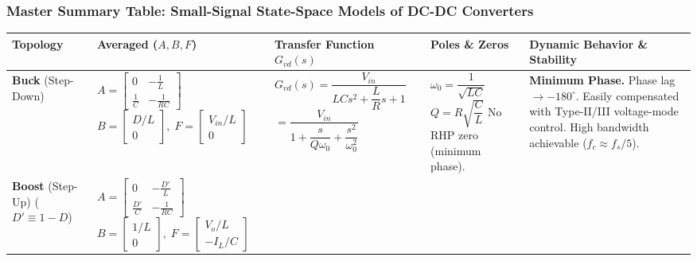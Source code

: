 \subsubsection{Master Summary Table: Small-Signal State-Space Models of DC-DC Converters}
\begin{center}
\footnotesize
\renewcommand{\arraystretch}{1.25}
\begin{tabularx}{\textwidth}{@{} >{\raggedright\arraybackslash}p{2.0cm} >{\raggedright\arraybackslash}p{2.6cm} >{\raggedright\arraybackslash}p{4.8cm} >{\raggedright\arraybackslash}p{2.6cm} >{\raggedright\arraybackslash}X @{}}
\toprule
\textbf{Topology} & \textbf{Averaged ($A, B, F$)} & \textbf{Transfer Function $G_{vd}(s)$} & \textbf{Poles \& Zeros} & \textbf{Dynamic Behavior \& Stability} \\
\midrule
\textbf{Buck} \newline (Step-Down) &
$A = \begin{bmatrix} 0 & -\frac{1}{L} \\ \frac{1}{C} & -\frac{1}{RC} \end{bmatrix}$ \newline
$B = \begin{bmatrix} D/L \\ 0 \end{bmatrix}, \; F = \begin{bmatrix} V_{in}/L \\ 0 \end{bmatrix}$ &
$G_{vd}(s) = \dfrac{V_{in}}{L C s^2 + \dfrac{L}{R} s + 1}$ \newline
$= \dfrac{V_{in}}{1 + \dfrac{s}{Q\omega_0} + \dfrac{s^2}{\omega_0^2}}$ &
$\omega_0 = \dfrac{1}{\sqrt{LC}}$ \newline
$Q = R\sqrt{\dfrac{C}{L}}$ \newline
No RHP zero (minimum phase). &
\textbf{Minimum Phase.} Phase lag $\to -180^\circ$. Easily compensated with Type-II/III voltage-mode control. High bandwidth achievable ($f_c \approx f_s/5$). \\
\midrule
\textbf{Boost} \newline (Step-Up) \newline ($D' \equiv 1-D$) &
$A = \begin{bmatrix} 0 & -\frac{D'}{L} \\ \frac{D'}{C} & -\frac{1}{RC} \end{bmatrix}$ \newline
$B = \begin{bmatrix} 1/L \\ 0 \end{bmatrix}, \; F = \begin{bmatrix} V_o/L \\ -I_L/C \end{bmatrix}$ &

\end{tabularx}
\end{center}
